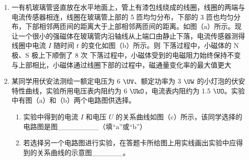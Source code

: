 \documentclass[\gkver]{gaokaozhenti}
\begin{document}
\begin{enumerate}
\item
一有机玻璃管竖直放在水平地面上，管上有漆包线绕成的线圈，线圈的两端与电流传感器相连，线圈在玻璃管上部的 5 匝均匀分布，下部的 3 匝也均匀分布，下部相邻两匝间的距离大于上部相邻两匝间的距离。如图（a）所示。现让一个很小的强磁体在玻璃管内沿轴线从上端口由静止下落，电流传感器测得线圈中电流 $I$ 随时间 $t$ 的变化如图（b）所示。则
{下落过程中，小磁体的 N 极、S 极上下顺倒了 8 次}
{下落过程中，小磁体受到的电磁阻力始终保持不变}
{与上部相比，小磁体通过线圈下部的过程中，磁通量变化率的最大值更大}

\item
某同学用伏安法测绘一额定电压为 6 $\UV$、额定功率为 3 $\UW$ 的小灯泡的伏安特性曲线，实验所用电压表内阻约为 6 $\UkO$，电流表内阻约为 1.5 $\UO$。实验中有图（a）和（b）两个电路图供选择。
\begin{enumerate}
	\item
	实验中得到的电流 $I$ 和电压 $U$ 的关系曲线如图（c）所示，该同学选择的电路图是图\_\_\_\_\_\_\_\_（填“a”或“b”）
	\item
	若选择另一个电路图进行实验，在答题卡所给图上用实线画出实验中应得到的关系曲线的示意图\_\_\_\_\_\_。
\end{enumerate}
\end{enumerate}
\end{document}
